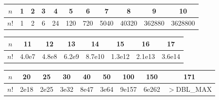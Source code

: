 \begingroup
\centering
\small
\setlength{\tabcolsep}{3pt}
\renewcommand{\arraystretch}{0.9}
\begin{tabular}{@{}c|*{10}{c}@{}}
$n$  & 1 & 2 & 3 & 4  & 5   & 6   & 7    & 8     & 9      & 10\\
\hline
$n!$ & 1 & 2 & 6 & 24 & 120 & 720 & 5040 & 40320 & 362880 & 3628800\\
\end{tabular}

\begin{tabular}{@{}c|*{7}{c}@{}}
$n$  & 11    & 12    & 13    & 14     & 15     & 16     & 17\\
\hline
$n!$ & 4.0e7 & 4.8e8 & 6.2e9 & 8.7e10 & 1.3e12 & 2.1e13 & 3.6e14\\
\end{tabular}

\begin{tabular}{@{}c|*{8}{c}@{}}
$n$  & 20   & 25   & 30   & 40   & 50   & 100   & 150   & 171\\
\hline
$n!$ & 2e18 & 2e25 & 3e32 & 8e47 & 3e64 & 9e157 & 6e262 & \scriptsize{$>$DBL\_MAX}\\
\end{tabular}
\par
\endgroup
